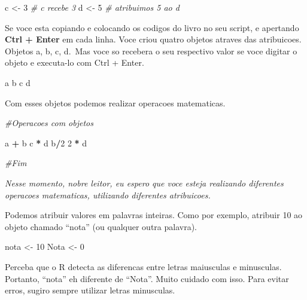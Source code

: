 \documentclass[
]{book}
\newenvironment{Shaded}{\begin{snugshade}}{\end{snugshade}}
\newcommand{\CommentTok}[1]{\textcolor[rgb]{0.56,0.35,0.01}{\textit{#1}}}
\newcommand{\DecValTok}[1]{\textcolor[rgb]{0.00,0.00,0.81}{#1}}
\newcommand{\NormalTok}[1]{#1}
\newcommand{\OtherTok}[1]{\textcolor[rgb]{0.56,0.35,0.01}{#1}}
\newcommand{\SpecialCharTok}[1]{\textcolor[rgb]{0.81,0.36,0.00}{\textbf{#1}}}
\begin{document}
\begin{Shaded}
\begin{Highlighting}[]
\NormalTok{c }\OtherTok{\textless{}{-}} \DecValTok{3} \CommentTok{\# c recebe 3}
\NormalTok{d }\OtherTok{\textless{}{-}} \DecValTok{5} \CommentTok{\# atribuimos 5 ao d}
\end{Highlighting}
\end{Shaded}

Se voce esta copiando e colocando os codigos do livro no seu script, e apertando \textbf{Ctrl + Enter} em cada linha. Voce criou quatro objetos atraves das atribuicoes. Objetos a, b, c, d.~Mas voce so recebera o seu respectivo valor se voce digitar o objeto e executa-lo com Ctrl + Enter.

\begin{Shaded}
\begin{Highlighting}[]
\NormalTok{a}
\NormalTok{b}
\NormalTok{c}
\NormalTok{d}
\end{Highlighting}
\end{Shaded}

Com esses objetos podemos realizar operacoes matematicas.

\begin{Shaded}
\begin{Highlighting}[]
\CommentTok{\#Operacoes com objetos}

\NormalTok{a }\SpecialCharTok{+}\NormalTok{ b}
\NormalTok{c }\SpecialCharTok{*}\NormalTok{ d}
\NormalTok{b}\SpecialCharTok{/}\DecValTok{2}
\DecValTok{2} \SpecialCharTok{*}\NormalTok{ d}

\CommentTok{\#Fim}
\end{Highlighting}
\end{Shaded}

\emph{Nesse momento, nobre leitor, eu espero que voce esteja realizando diferentes operacoes matematicas, utilizando diferentes atribuicoes.}

Podemos atribuir valores em palavras inteiras. Como por exemplo, atribuir 10 ao objeto chamado ``nota'' (ou qualquer outra palavra).

\begin{Shaded}
\begin{Highlighting}[]
\NormalTok{nota }\OtherTok{\textless{}{-}} \DecValTok{10}
\NormalTok{Nota }\OtherTok{\textless{}{-}} \DecValTok{0}
\end{Highlighting}
\end{Shaded}

Perceba que o R detecta as diferencas entre letras maiusculas e minusculas. Portanto, ``nota'' eh diferente de ``Nota''. Muito cuidado com isso. Para evitar erros, sugiro sempre utilizar letras minusculas.
\end{document}
